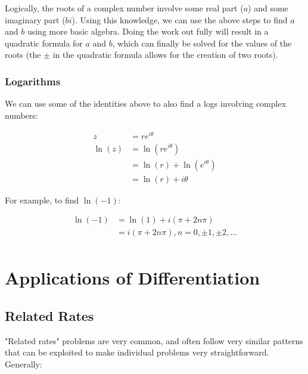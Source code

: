 \documentclass[12pt]{article}
\begin{document}
Logically, the roots of a complex number involve some real part ($a$) and some imaginary part ($bi$). Using this knowledge, we can use the above steps to find $a$ and $b$ using more basic algebra. Doing the work out fully will result in a quadratic formula for $a$ and $b$, which can finally be solved for the values of the roots (the $\pm$ in the quadratic formula allows for the creation of two roots).

\subsubsection{Logarithms}

We can use some of the identities above to also find a logs involving complex numbers:

\begin{equation}
    \begin{split}
        z &= re^{i\theta}\\
        \ln(z) &= \ln(re^{i\theta})\\
        &= \ln(r) + \ln(e^{i\theta})\\
        &= \ln(r) + i\theta
    \end{split}
\end{equation}

For example, to find $\ln(-1)$:

\begin{equation}
    \begin{split}
        \ln(-1) &= \ln(1) + i(\pi + 2n\pi)\\
        &= i(\pi + 2n\pi), n = 0, \pm 1, \pm 2, ...\\
    \end{split}
\end{equation}

\newpage
\section{Applications of Differentiation}
\subsection{Related Rates}

"Related rates" problems are very common, and often follow very similar patterns that can be exploited to make individual problems very straightforward. Generally:
\end{document}
